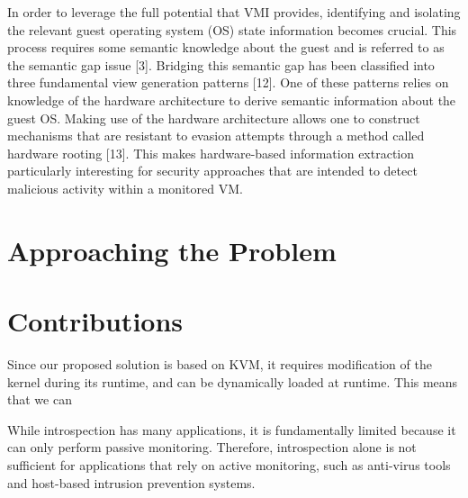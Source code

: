 \documentclass{report}
\begin{document}
\begin{spacing}{1.5}
In order to leverage the full potential that VMI provides, identifying and
isolating the relevant guest operating system (OS) state information becomes
crucial. This process requires some semantic knowledge about the guest and is
referred to as the semantic gap issue [3]. Bridging this semantic gap has been
classified into three fundamental view generation patterns [12]. One of these
patterns relies on knowledge of the hardware architecture to derive semantic
information about the guest OS. Making use of the hardware architecture allows
one to construct mechanisms that are resistant to evasion attempts through a
method called hardware rooting [13]. This makes hardware-based information
extraction particularly interesting for security approaches that are intended to
detect malicious activity within a monitored VM.















\section{Approaching the Problem}

















\section{Contributions}


Since our proposed solution is based on KVM, it requires modification of the kernel during its runtime, and can be dynamically loaded at runtime. This means that we can 





While introspection has many applications, it is fundamentally limited because it can only perform passive monitoring. Therefore, introspection alone is not sufficient for applications that rely on active monitoring, such as anti-virus
tools and host-based intrusion prevention systems.












\end{spacing}
\end{document}

